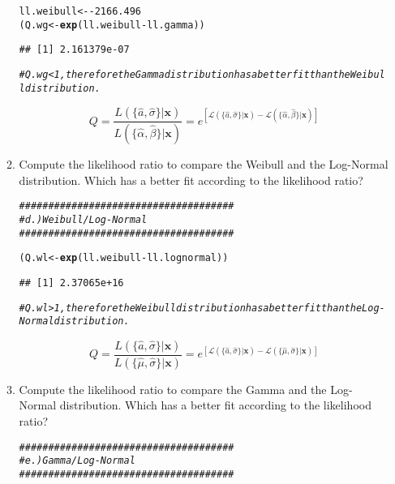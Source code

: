 \documentclass{article}\usepackage[]{graphicx}\usepackage[]{xcolor}
\makeatletter
\newcommand{\hlnum}[1]{\textcolor[rgb]{0.686,0.059,0.569}{#1}}%
\newcommand{\hlcom}[1]{\textcolor[rgb]{0.678,0.584,0.686}{\textit{#1}}}%
\newcommand{\hlopt}[1]{\textcolor[rgb]{0,0,0}{#1}}%
\newcommand{\hldef}[1]{\textcolor[rgb]{0.345,0.345,0.345}{#1}}%
\newcommand{\hlkwb}[1]{\textcolor[rgb]{0.69,0.353,0.396}{#1}}%
\newcommand{\hlkwd}[1]{\textcolor[rgb]{0.737,0.353,0.396}{\textbf{#1}}}%
\newenvironment{kframe}{%
 \def\at@end@of@kframe{}%
 \ifinner\ifhmode%
  \def\at@end@of@kframe{\end{minipage}}%
  \begin{minipage}{\columnwidth}%
 \fi\fi%
 \def\FrameCommand##1{\hskip\@totalleftmargin \hskip-\fboxsep
 \colorbox{shadecolor}{##1}\hskip-\fboxsep
     \hskip-\linewidth \hskip-\@totalleftmargin \hskip\columnwidth}%
 \MakeFramed {\advance\hsize-\width
   \@totalleftmargin\z@ \linewidth\hsize
   \@setminipage}}%
 {\par\unskip\endMakeFramed%
 \at@end@of@kframe}
\newenvironment{knitrout}{}{} %
\makeatother
\begin{document}
\begin{enumerate}
\begin{enumerate}
\begin{knitrout}
\begin{kframe}
\begin{alltt}
\hldef{ll.weibull} \hlkwb{<-} \hlopt{-}\hlnum{2166.496}
\hldef{(Q.wg} \hlkwb{<-} \hlkwd{exp}\hldef{(ll.weibull} \hlopt{-} \hldef{ll.gamma))}
\end{alltt}
\begin{verbatim}
## [1] 2.161379e-07
\end{verbatim}
\begin{alltt}
\hlcom{# Q.wg < 1, therefore the Gamma distribution has a better fit than the Weibull distribution.}
\end{alltt}
\end{kframe}
\end{knitrout}
    \[Q = \frac{L(\{\hat{a}, \hat{\sigma}\}|\mathbf{x})}{L(\{\hat{\alpha}, \hat{\beta}\}|\mathbf{x})}=e^{\left[\mathcal{L}(\{\hat{a}, \hat{\sigma}\}|\mathbf{x}) - \mathcal{L}(\{\hat{\alpha}, \hat{\beta}\}|\mathbf{x})\right]}\]
    \item Compute the likelihood ratio to compare the Weibull and the Log-Normal distribution.
    Which has a better fit according to the likelihood ratio?
\begin{knitrout}\scriptsize
{}\color{fgcolor}\begin{kframe}
\begin{alltt}
\hlcom{#####################################}
\hlcom{# d.) Weibull / Log-Normal}
\hlcom{#####################################}

\hldef{(Q.wl} \hlkwb{<-} \hlkwd{exp}\hldef{(ll.weibull} \hlopt{-} \hldef{ll.lognormal))}
\end{alltt}
\begin{verbatim}
## [1] 2.37065e+16
\end{verbatim}
\begin{alltt}
\hlcom{# Q.wl > 1, therefore the Weibull distribution has a better fit than the Log-Normal distribution.}
\end{alltt}
\end{kframe}
\end{knitrout}
    \[Q = \frac{L(\{\hat{a}, \hat{\sigma}\}|\mathbf{x})}{L(\{\hat{\mu}, \hat{\sigma}\}|\mathbf{x})}=e^{\left[\mathcal{L}(\{\hat{a}, \hat{\sigma}\}|\mathbf{x}) - \mathcal{L}(\{\hat{\mu}, \hat{\sigma}\}|\mathbf{x})\right]}\]
    \item Compute the likelihood ratio to compare the Gamma and the Log-Normal distribution.
    Which has a better fit according to the likelihood ratio?
\begin{knitrout}\scriptsize
{}\color{fgcolor}\begin{kframe}
\begin{alltt}
\hlcom{#####################################}
\hlcom{# e.) Gamma / Log-Normal}
\hlcom{#####################################}


\end{alltt}
\end{kframe}
\end{knitrout}
\end{enumerate}
\end{enumerate}
\end{document}
